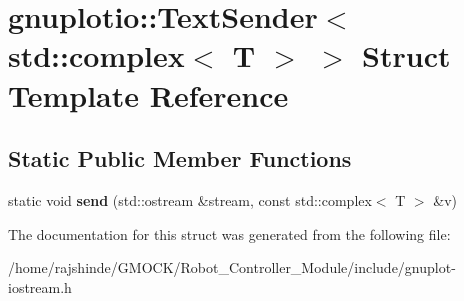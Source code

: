 \hypertarget{structgnuplotio_1_1_text_sender_3_01std_1_1complex_3_01_t_01_4_01_4}{}\section{gnuplotio\+:\+:Text\+Sender$<$ std\+:\+:complex$<$ T $>$ $>$ Struct Template Reference}
\label{structgnuplotio_1_1_text_sender_3_01std_1_1complex_3_01_t_01_4_01_4}
\subsection*{Static Public Member Functions}
\begin{DoxyCompactItemize}
\item 
static void {\bfseries send} (std\+::ostream \&stream, const std\+::complex$<$ T $>$ \&v)\hypertarget{structgnuplotio_1_1_text_sender_3_01std_1_1complex_3_01_t_01_4_01_4_ad524aa3e121d0ebd66346d77f1fd5a1c}{}\label{structgnuplotio_1_1_text_sender_3_01std_1_1complex_3_01_t_01_4_01_4_ad524aa3e121d0ebd66346d77f1fd5a1c}

\end{DoxyCompactItemize}


The documentation for this struct was generated from the following file\+:\begin{DoxyCompactItemize}
\item 
/home/rajshinde/\+G\+M\+O\+C\+K/\+Robot\+\_\+\+Controller\+\_\+\+Module/include/gnuplot-\/iostream.\+h\end{DoxyCompactItemize}
